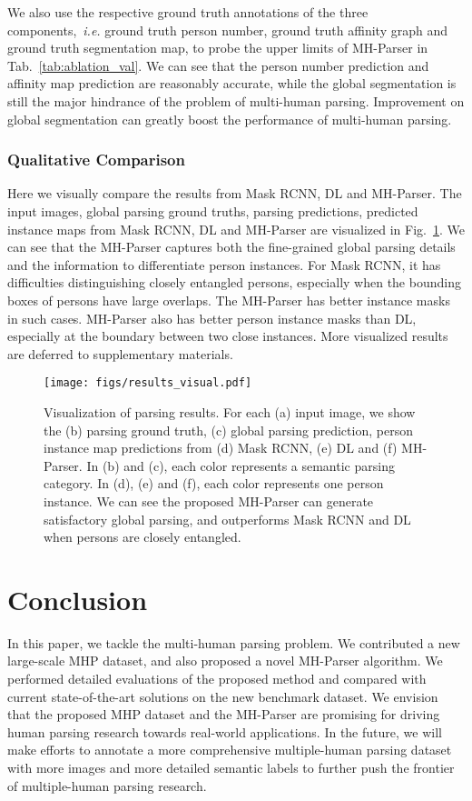 \documentclass[10pt, letterpaper]{article}
\begin{document}
We also use the respective ground truth annotations of the three components,~\emph{i.e.} ground truth person number, ground truth affinity graph and ground truth segmentation map, to probe the upper limits of MH-Parser in Tab.~\ref{tab:ablation_val}. We can see that the person number prediction and affinity map prediction are reasonably accurate, while the global segmentation is still the major hindrance of the problem of multi-human parsing. Improvement on global segmentation can greatly boost the performance of multi-human parsing.
 
\subsubsection{Qualitative Comparison}
Here we visually compare the results from Mask RCNN, DL and MH-Parser. The input images, global parsing ground truths, parsing predictions, predicted instance maps from Mask RCNN, DL and MH-Parser are visualized in Fig.~\ref{fig:visual}. We can see that the MH-Parser captures both the fine-grained global parsing details and the information to differentiate person instances. For Mask RCNN, it has difficulties distinguishing closely entangled persons, especially when the bounding boxes of persons have large overlaps. The MH-Parser has better instance masks in such cases. MH-Parser also has better person instance masks than DL, especially at the boundary between two close instances. More visualized results are deferred to supplementary materials. 

\begin{figure}[!t]
  \centering
  \texttt{[image: figs/results\_visual.pdf]}
  \caption{Visualization of parsing results. For each (a) input image, we show the (b) parsing ground truth,  (c) global parsing prediction,  person instance map predictions from (d) Mask RCNN, (e) DL and (f) MH-Parser. In (b) and (c), each color represents a semantic parsing category. In (d), (e) and (f), each color represents one person instance. We can see the proposed MH-Parser can generate satisfactory global parsing, and outperforms Mask RCNN and DL when persons are closely entangled.} \label{fig:visual}
\end{figure}

\section{Conclusion}
In this paper, we tackle the multi-human parsing problem. We contributed a new large-scale MHP dataset, and also proposed a novel MH-Parser algorithm. We performed detailed evaluations of the proposed method and compared with current state-of-the-art solutions on the new benchmark dataset.  We envision that the proposed MHP dataset and the MH-Parser are promising for driving human parsing research towards real-world applications. In the future, we will make efforts to annotate a more comprehensive multiple-human parsing dataset with more images and more detailed semantic labels to further push the frontier of multiple-human parsing research.
\end{document}
